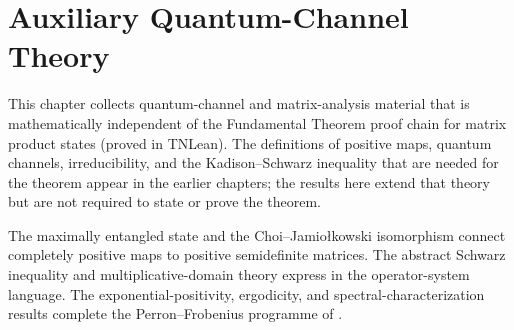 \chapter{Auxiliary Quantum-Channel Theory}\label{ch:aux_channel_theory}

This chapter collects quantum-channel and matrix-analysis material that is
mathematically independent of the Fundamental Theorem proof chain for matrix
product states (proved in TNLean). The definitions of positive maps,
quantum channels, irreducibility, and the Kadison--Schwarz inequality that
are needed for the theorem appear in the earlier chapters; the results here
extend that theory but are not required to state or prove the theorem.

The maximally entangled state and the
Choi--Jamio\l{}kowski isomorphism connect completely positive maps to positive
semidefinite matrices. The abstract Schwarz inequality and multiplicative-domain theory express
\cite[Chapter~5]{Wolf2012Quantum} in the operator-system language.  The
exponential-positivity, ergodicity, and spectral-characterization results
complete the Perron--Frobenius programme of
\cite[Chapter~6]{Wolf2012Quantum}.





